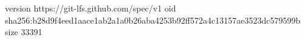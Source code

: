 version https://git-lfs.github.com/spec/v1
oid sha256:b28d9f4eed1aace1ab2a1a0b26aba4253b92ff572a4c13157ae3523dc579599b
size 33391
